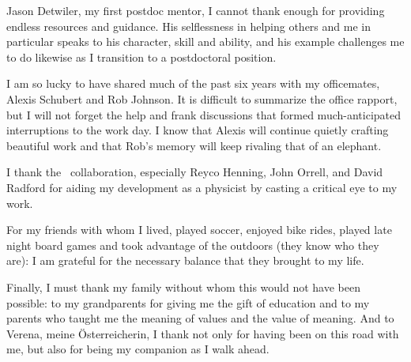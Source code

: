 {Jason Detwiler, my first postdoc mentor, I cannot thank enough for providing
endless resources and guidance.  His selflessness in helping others and me in
particular speaks to his character, skill and ability, and his example
challenges me to do likewise as I transition to a postdoctoral position. 

I am so lucky to have shared much of the past six years with my officemates,
Alexis Schubert and Rob Johnson.  It is difficult to summarize the office
rapport, but I will not forget the help and frank discussions that formed
much-anticipated interruptions to the work day.  I know that Alexis will continue
quietly crafting beautiful work and that Rob's memory will keep rivaling that
of an elephant. 

I thank the \MJ~collaboration, especially Reyco Henning, John Orrell, and David
Radford for aiding my development as a physicist by casting a critical eye to
my work. 

For my friends with whom I lived, played soccer, enjoyed bike rides, played
late night board games and took advantage of the outdoors (they know who they are): I am grateful for
the necessary balance that they brought to my life.

Finally, I must thank my family without whom this would not have been possible: to my
grandparents for giving me the gift of education and to my parents who taught
me the meaning of values and the value of meaning.  And to Verena, meine
\"{O}sterreicherin, I thank not only for having been on this road with me, but
also for being my companion as I walk ahead.  
}


